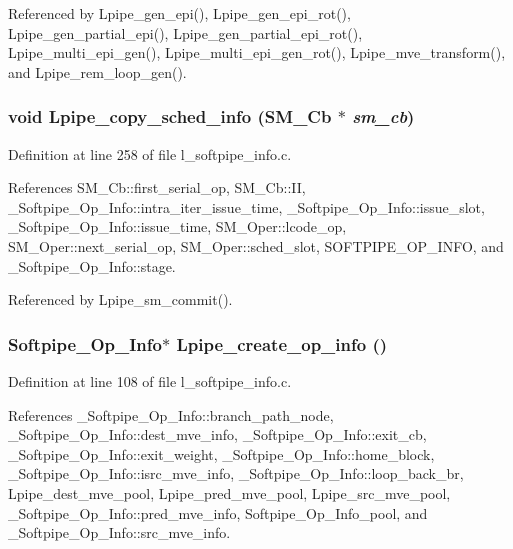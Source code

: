 Referenced by Lpipe\_\-gen\_\-epi(), Lpipe\_\-gen\_\-epi\_\-rot(), Lpipe\_\-gen\_\-partial\_\-epi(), Lpipe\_\-gen\_\-partial\_\-epi\_\-rot(), Lpipe\_\-multi\_\-epi\_\-gen(), Lpipe\_\-multi\_\-epi\_\-gen\_\-rot(), Lpipe\_\-mve\_\-transform(), and Lpipe\_\-rem\_\-loop\_\-gen().
\subsubsection{\setlength{\rightskip}{0pt plus 5cm}void Lpipe\_\-copy\_\-sched\_\-info (\bf{SM\_\-Cb} $\ast$ {\em sm\_\-cb})}\label{l__softpipe__info_8c_2f8e0402029878eba06bf8e9c870bf9b}




Definition at line 258 of file l\_\-softpipe\_\-info.c.

References SM\_\-Cb::first\_\-serial\_\-op, SM\_\-Cb::II, \_\-Softpipe\_\-Op\_\-Info::intra\_\-iter\_\-issue\_\-time, \_\-Softpipe\_\-Op\_\-Info::issue\_\-slot, \_\-Softpipe\_\-Op\_\-Info::issue\_\-time, SM\_\-Oper::lcode\_\-op, SM\_\-Oper::next\_\-serial\_\-op, SM\_\-Oper::sched\_\-slot, SOFTPIPE\_\-OP\_\-INFO, and \_\-Softpipe\_\-Op\_\-Info::stage.

Referenced by Lpipe\_\-sm\_\-commit().
\subsubsection{\setlength{\rightskip}{0pt plus 5cm}\bf{Softpipe\_\-Op\_\-Info}$\ast$ Lpipe\_\-create\_\-op\_\-info ()}\label{l__softpipe__info_8c_20e0bb7258cae1e6da705eff2689ea9c}




Definition at line 108 of file l\_\-softpipe\_\-info.c.

References \_\-Softpipe\_\-Op\_\-Info::branch\_\-path\_\-node, \_\-Softpipe\_\-Op\_\-Info::dest\_\-mve\_\-info, \_\-Softpipe\_\-Op\_\-Info::exit\_\-cb, \_\-Softpipe\_\-Op\_\-Info::exit\_\-weight, \_\-Softpipe\_\-Op\_\-Info::home\_\-block, \_\-Softpipe\_\-Op\_\-Info::isrc\_\-mve\_\-info, \_\-Softpipe\_\-Op\_\-Info::loop\_\-back\_\-br, Lpipe\_\-dest\_\-mve\_\-pool, Lpipe\_\-pred\_\-mve\_\-pool, Lpipe\_\-src\_\-mve\_\-pool, \_\-Softpipe\_\-Op\_\-Info::pred\_\-mve\_\-info, Softpipe\_\-Op\_\-Info\_\-pool, and \_\-Softpipe\_\-Op\_\-Info::src\_\-mve\_\-info.

